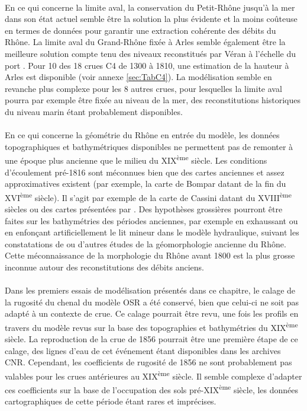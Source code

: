 	\paragraph{} En ce qui concerne la limite aval, la conservation du Petit-Rhône jusqu'à la mer dans son état actuel semble être la solution la plus évidente et la moins coûteuse en termes de données pour garantir une extraction cohérente des débits du Rhône. La limite aval du Grand-Rhône fixée à Arles semble également être la meilleure solution compte tenu des niveaux reconstitués par Véran à l'échelle du port \citep{pichard_les_1995}. Pour 10 des 18 crues C4 de 1300 à 1810, une estimation de la hauteur à Arles est disponible (voir annexe \ref{sec:TabC4}). La modélisation semble en revanche plus complexe pour les 8 autres crues, pour lesquelles la limite aval pourra par exemple être fixée au niveau de la mer, des reconstitutions historiques du niveau marin étant probablement disponibles.
	
	\paragraph{} En ce qui concerne la géométrie du Rhône en entrée du modèle, les données topographiques et bathymétriques disponibles ne permettent pas de remonter à une époque plus ancienne que le milieu du XIX\textsuperscript{ème} siècle. Les conditions d'écoulement pré-1816 sont méconnues bien que des cartes anciennes et assez approximatives existent (par exemple, la carte de Bompar datant de la fin du XVI\textsuperscript{ème} siècle). Il s'agit par exemple de la carte de Cassini datant du XVIII\textsuperscript{ème} siècles ou des cartes présentées par \citet{pichard_sept_2014}. Des hypothèses grossières pourront être faites sur les bathymétries des périodes anciennes, par exemple en exhaussant ou en enfonçant artificiellement le lit mineur dans le modèle hydraulique, suivant les constatations de \citet{pichard_sept_2014} ou d'autres études de la géomorphologie ancienne du Rhône. Cette méconnaissance de la morphologie du Rhône avant 1800 est la plus grosse inconnue autour des reconstitutions des débits anciens.
	
	\paragraph{} Dans les premiers essais de modélisation présentés dans ce chapitre, le calage de la rugosité du chenal du modèle OSR a été conservé, bien que celui-ci ne soit pas adapté à un contexte de crue. Ce calage pourrait être revu, une fois les profils en travers du modèle revus sur la base des topographies et bathymétries du XIX\textsuperscript{ème} siècle. La reproduction de la crue de 1856 pourrait être une première étape de ce calage, des lignes d'eau de cet événement étant disponibles dans les archives CNR. Cependant, les coefficients de rugosité de 1856 ne sont probablement pas valables pour les crues antérieures au XIX\textsuperscript{ème} siècle. Il semble complexe d'adapter ces coefficients sur la base de l'occupation des sols pré-XIX\textsuperscript{ème} siècle, les données cartographiques de cette période étant rares et imprécises. 
	
